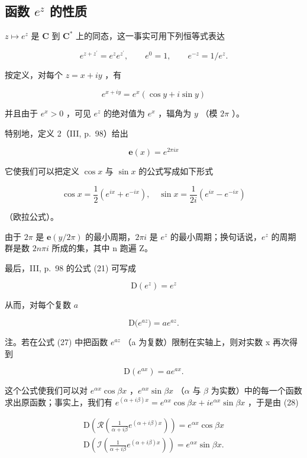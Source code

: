 \subsection{\texorpdfstring{函数 \(e^{z}\) 的性质}{函数 e 的 z 次幂的性质}}

\(z \mapsto e^z\) 是 \(\mathbf{C}\) 到 \(\mathbf{C}^*\) 上的同态，这一事实可用下列恒等式表达

\[
e ^ {z + z ^ {\prime}} = e ^ {z} e ^ {z ^ {\prime}}, \qquad e ^ {0} = 1, \qquad e ^ {- z} = 1 / e ^ {z}.\tag{22}
\]

按定义，对每个 \(z = x + iy\) ，有

\[
e ^ {x + i y} = e ^ {x} (\cos y + i \sin y)\tag{23}
\]

并且由于 \(e^x > 0\) ，可见 \(e^z\) 的绝对值为 \(e^x\) ，辐角为 \(y\) （模 \(2\pi\) ）。

特别地，定义 2（III, p.~98）给出

\[
\mathbf {e} (x) = e ^ {2 \pi i x}\tag{24}
\]

它使我们可以把定义 \(\cos x\) 与 \(\sin x\) 的公式写成如下形式

\[
\cos x = \frac {1}{2} \left(e ^ {i x} + e ^ {- i x}\right), \quad \sin x = \frac {1}{2 i} \left(e ^ {i x} - e ^ {- i x}\right)\tag{25}
\]

（欧拉公式）。

由于 \(2\pi\) 是 \(\mathbf{e}(y/2\pi)\) 的最小周期，\(2\pi i\) 是 \(e^{z}\) 的最小周期；换句话说，\(e^{z}\) 的周期群是数 \(2n\pi i\) 所成的集，其中 n 跑遍 Z。

最后，III, p.~98 的公式 (21) 可写成

\[
\mathrm{D} \left(e ^ {z}\right) = e ^ {z}\tag{26}
\]

从而，对每个复数 \(a\)

\[
\mathrm{D} \big (e ^ {a z} \big) = a e ^ {a z}.\tag{27}
\]

注。若在公式 (27) 中把函数 \(e^{az}\) （a 为复数）限制在实轴上，则对实数 x 再次得到

\[
\mathrm{D} (e ^ {a x}) = a e ^ {a x}.\tag{28}
\]

这个公式使我们可以对 \(e^{\alpha x} \cos \beta x\) ，\(e^{\alpha x} \sin \beta x\) （\(\alpha\) 与 \(\beta\) 为实数）中的每一个函数求出原函数；事实上，我们有 \(e^{(\alpha + i\beta)x} = e^{\alpha x} \cos \beta x + ie^{\alpha x} \sin \beta x\) ，于是由 (28)

\[
\begin{array}{l} \mathrm{D} \left(\mathcal {R} \left(\frac {1}{\alpha + i \beta} e ^ {(\alpha + i \beta) x}\right)\right) = e ^ {\alpha x} \cos \beta x \\ \mathrm{D} \left(\mathcal {I} \left(\frac {1}{\alpha + i \beta} e ^ {(\alpha + i \beta) x}\right)\right) = e ^ {\alpha x} \sin \beta x. \end{array}
\]

